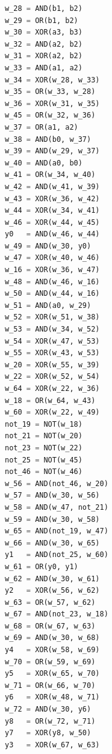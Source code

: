\documentclass[11pt]{article}
\begin{document}
\begin{lstlisting}[language=Python,basicstyle=\ttfamily\footnotesize]
w_28 = AND(b1, b2)
w_29 = OR(b1, b2)
w_30 = XOR(a3, b3)
w_32 = AND(a2, b2)
w_31 = XOR(a2, b2)
w_33 = AND(a1, a2)
w_34 = XOR(w_28, w_33)
w_35 = OR(w_33, w_28)
w_36 = XOR(w_31, w_35)
w_45 = OR(w_32, w_36)
w_37 = OR(a1, a2)
w_38 = AND(b0, w_37)
w_39 = AND(w_29, w_37)
w_40 = AND(a0, b0)
w_41 = OR(w_34, w_40)
w_42 = AND(w_41, w_39)
w_43 = XOR(w_36, w_42)
w_44 = XOR(w_34, w_41)
w_46 = XOR(w_44, w_45)
y0   = AND(w_46, w_44)
w_49 = AND(w_30, y0)
w_47 = XOR(w_40, w_46)
w_16 = XOR(w_36, w_47)
w_48 = AND(w_46, w_16)
w_50 = AND(w_44, w_16)
w_51 = AND(a0, w_29)
w_52 = XOR(w_51, w_38)
w_53 = AND(w_34, w_52)
w_54 = XOR(w_47, w_53)
w_55 = XOR(w_43, w_53)
w_20 = XOR(w_55, w_39)
w_22 = XOR(w_52, w_54)
w_64 = XOR(w_22, w_36)
w_18 = OR(w_64, w_43)
w_60 = XOR(w_22, w_49)
not_19 = NOT(w_18)
not_21 = NOT(w_20)
not_23 = NOT(w_22)
not_25 = NOT(w_45)
not_46 = NOT(w_46)
w_56 = AND(not_46, w_20)
w_57 = AND(w_30, w_56)
w_58 = AND(w_47, not_21)
w_59 = AND(w_30, w_58)
w_65 = AND(not_19, w_47)
w_66 = AND(w_30, w_65)
y1   = AND(not_25, w_60)
w_61 = OR(y0, y1)
w_62 = AND(w_30, w_61)
y2   = XOR(w_56, w_62)
w_63 = OR(w_57, w_62)
w_67 = AND(not_23, w_18)
w_68 = OR(w_67, w_63)
w_69 = AND(w_30, w_68)
y4   = XOR(w_58, w_69)
w_70 = OR(w_59, w_69)
y5   = XOR(w_65, w_70)
w_71 = OR(w_66, w_70)
y6   = XOR(w_48, w_71)
w_72 = AND(w_30, y6)
y8   = OR(w_72, w_71)
y7   = XOR(y8, w_50)
y3   = XOR(w_67, w_63)
\end{lstlisting}
\end{document}
